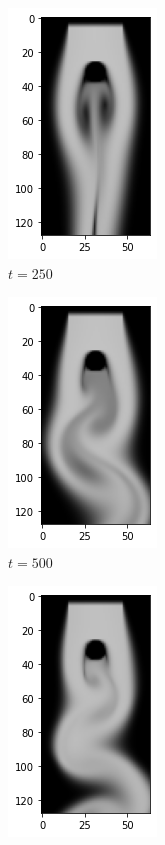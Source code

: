 \documentclass[a4paper,12pt,twoside]{report}
\begin{document}
\begin{figure}
	\centering
	\begin{subfigure}{0.18\textwidth}
		\centering
		\includegraphics[scale=0.5]{karmanflow/mse_density_000250.png}
		\caption{$t=250$}
	\end{subfigure}
	\begin{subfigure}{0.18\textwidth}
		\centering
		\includegraphics[scale=0.5]{karmanflow/mse_density_000500.png}
		\caption{$t=500$}
	\end{subfigure}
	\begin{subfigure}{0.18\textwidth}
		\centering
		\includegraphics[scale=0.5]{karmanflow/mse_density_001000.png}

\end{subfigure}
\end{figure}
\end{document}
